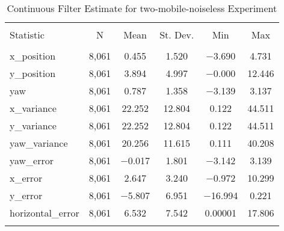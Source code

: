 
\begin{table}[h] \centering 
  \caption{Continuous Filter Estimate for two-mobile-noiseless Experiment} 
  \label{tab:two_mobile_noiseless_continuous_summary} 
\begin{tabular}{@{\extracolsep{5pt}}lccccc} 
\\[-1.8ex]\hline 
\hline \\[-1.8ex] 
Statistic & \multicolumn{1}{c}{N} & \multicolumn{1}{c}{Mean} & \multicolumn{1}{c}{St. Dev.} & \multicolumn{1}{c}{Min} & \multicolumn{1}{c}{Max} \\ 
\hline \\[-1.8ex] 
x\_position & 8,061 & 0.455 & 1.520 & $-$3.690 & 4.731 \\ 
y\_position & 8,061 & 3.894 & 4.997 & $-$0.000 & 12.446 \\ 
yaw & 8,061 & 0.787 & 1.358 & $-$3.139 & 3.137 \\ 
x\_variance & 8,061 & 22.252 & 12.804 & 0.122 & 44.511 \\ 
y\_variance & 8,061 & 22.252 & 12.804 & 0.122 & 44.511 \\ 
yaw\_variance & 8,061 & 20.256 & 11.615 & 0.111 & 40.208 \\ 
yaw\_error & 8,061 & $-$0.017 & 1.801 & $-$3.142 & 3.139 \\ 
x\_error & 8,061 & 2.647 & 3.240 & $-$0.972 & 10.299 \\ 
y\_error & 8,061 & $-$5.807 & 6.951 & $-$16.994 & 0.221 \\ 
horizontal\_error & 8,061 & 6.532 & 7.542 & 0.00001 & 17.806 \\ 
\hline \\[-1.8ex] 
\end{tabular} 
\end{table} 
